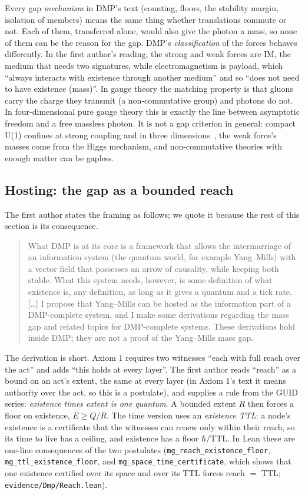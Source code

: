 \documentclass[11pt,a4paper]{article}
\newcommand{\lean}[1]{\texttt{#1}}
\begin{document}
Every gap \emph{mechanism} in DMP's text (counting, floors, the stability margin, isolation of members) means the same thing whether
translations commute or not. Each of them, transferred alone, would also give the photon a mass, so none of them can be the reason for the
gap. DMP's \emph{classification} of the forces behaves differently. In the first author's reading, the strong and weak forces are IM,
the medium that needs two signatures, while electromagnetism is payload, which ``always interacts with existence through another medium''
and so ``does not need to have existence (mass)''. In gauge theory the matching property is that gluons carry the charge they transmit (a
non-commutative group) and photons do not. In four-dimensional pure gauge theory this is exactly the line between asymptotic freedom and a
free massless photon. It is not a gap criterion in general: compact U(1) confines at strong coupling and in three dimensions~\cite{gm82},
the weak force's masses come from the Higgs mechanism, and non-commutative theories with enough matter can be gapless.

\subsection{Hosting: the gap as a bounded reach}\label{sec:reach}

The first author states the framing as follows; we quote it because the rest of this section is its consequence.

\begin{quote}\small
What DMP is at its core is a framework that allows the intermarriage of an information system (the quantum world, for example Yang--Mills)
with a vector field that possesses an arrow of causality, while keeping both stable. What this system needs, however, is some definition of
what existence is, any definition, as long as it gives a quantum and a tick rate. [\dots] I propose that Yang--Mills can be hosted as the
information part of a DMP-complete system, and I make some derivations regarding the mass gap and related topics for DMP-complete systems.
These derivations hold inside DMP; they are not a proof of the Yang--Mills mass gap.
\end{quote}

The derivation is short. Axiom 1 requires two witnesses ``each with full reach over the act'' and adds ``this holds at every layer''. The
first author reads ``reach'' as a bound on an act's extent, the same at every layer (in Axiom 1's text it means authority over the act, so
this is a postulate), and supplies a rule from the GUID series: \emph{existence times extent is one quantum}. A bounded extent $R$ then forces
a floor on existence, $E\ge Q/R$. The time version uses an \emph{existence TTL}: a node's existence is a certificate that the witnesses can
renew only within their reach, so its time to live has a ceiling, and existence has a floor $\hbar/\mathrm{TTL}$. In Lean these are one-line
consequences of the two postulates (\lean{mg\_reach\_existence\_floor}, \lean{mg\_ttl\_existence\_floor}, and \lean{mg\_space\_time\_certificate},
which shows that one existence certified over its space and over its TTL forces reach $=$ TTL; \lean{evidence/Dmp/Reach.lean}).
\end{document}
